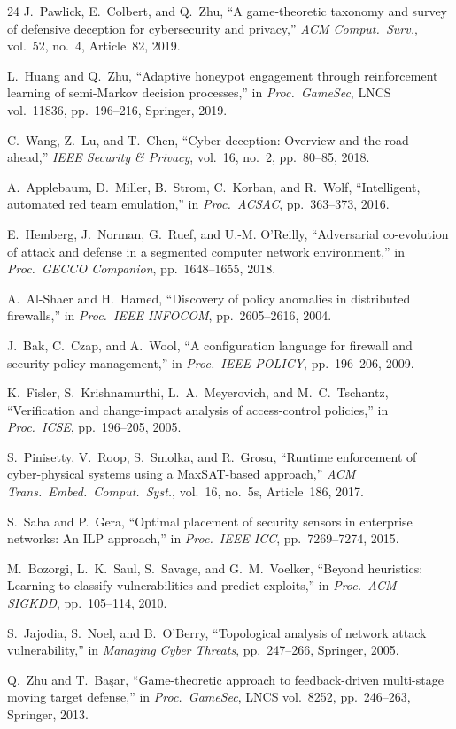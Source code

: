 \documentclass[journal]{IEEEtran}
\begin{document}
\begin{thebibliography}{24}
J.~Pawlick, E.~Colbert, and Q.~Zhu,
``A game-theoretic taxonomy and survey of defensive
deception for cybersecurity and privacy,''
\textit{ACM Comput.\ Surv.}, vol.~52, no.~4,
Article~82, 2019.

L.~Huang and Q.~Zhu,
``Adaptive honeypot engagement through reinforcement
learning of semi-Markov decision processes,''
in \textit{Proc.\ GameSec}, LNCS vol.~11836,
pp.~196--216, Springer, 2019.

C.~Wang, Z.~Lu, and T.~Chen,
``Cyber deception: Overview and the road ahead,''
\textit{IEEE Security \& Privacy}, vol.~16, no.~2,
pp.~80--85, 2018.

A.~Applebaum, D.~Miller, B.~Strom, C.~Korban, and R.~Wolf,
``Intelligent, automated red team emulation,''
in \textit{Proc.\ ACSAC}, pp.~363--373, 2016.

E.~Hemberg, J.~Norman, G.~Ruef, and U.-M. O'Reilly,
``Adversarial co-evolution of attack and defense in a
segmented computer network environment,''
in \textit{Proc.\ GECCO Companion}, pp.~1648--1655, 2018.

A.~Al-Shaer and H.~Hamed,
``Discovery of policy anomalies in distributed firewalls,''
in \textit{Proc.\ IEEE INFOCOM}, pp.~2605--2616, 2004.

J.~Bak, C.~Czap, and A.~Wool,
``A configuration language for firewall and security policy
management,'' in \textit{Proc.\ IEEE POLICY},
pp.~196--206, 2009.

K.~Fisler, S.~Krishnamurthi, L.~A.~Meyerovich, and
M.~C.~Tschantz,
``Verification and change-impact analysis of access-control
policies,'' in \textit{Proc.\ ICSE}, pp.~196--205, 2005.

S.~Pinisetty, V.~Roop, S.~Smolka, and R.~Grosu,
``Runtime enforcement of cyber-physical systems using a
MaxSAT-based approach,''
\textit{ACM Trans.\ Embed.\ Comput.\ Syst.}, vol.~16,
no.~5s, Article~186, 2017.

S.~Saha and P.~Gera,
``Optimal placement of security sensors in enterprise
networks: An ILP approach,''
in \textit{Proc.\ IEEE ICC}, pp.~7269--7274, 2015.

M.~Bozorgi, L.~K.~Saul, S.~Savage, and G.~M.~Voelker,
``Beyond heuristics: Learning to classify vulnerabilities
and predict exploits,''
in \textit{Proc.\ ACM SIGKDD}, pp.~105--114, 2010.

S.~Jajodia, S.~Noel, and B.~O'Berry,
``Topological analysis of network attack vulnerability,''
in \textit{Managing Cyber Threats}, pp.~247--266,
Springer, 2005.

Q.~Zhu and T.~Ba\c{s}ar,
``Game-theoretic approach to feedback-driven multi-stage
moving target defense,''
in \textit{Proc.\ GameSec}, LNCS vol.~8252,
pp.~246--263, Springer, 2013.

\end{thebibliography}
\end{document}
